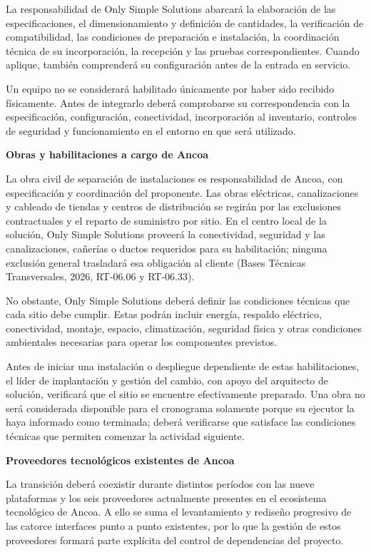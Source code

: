 \documentclass[11pt]{article}
\begin{document}
La responsabilidad de Only Simple Solutions abarcará la elaboración de
las especificaciones, el dimensionamiento y definición de cantidades, la
verificación de compatibilidad, las condiciones de preparación e
instalación, la coordinación técnica de su incorporación, la recepción y
las pruebas correspondientes. Cuando aplique, también comprenderá su
configuración antes de la entrada en servicio.

Un equipo no se considerará habilitado únicamente por haber sido
recibido físicamente. Antes de integrarlo deberá comprobarse su
correspondencia con la especificación, configuración, conectividad,
incorporación al inventario, controles de seguridad y funcionamiento en
el entorno en que será utilizado.

\textbf{Obras y habilitaciones a cargo de Ancoa}

La obra civil de separación de instalaciones es responsabilidad de
Ancoa, con especificación y coordinación del proponente. Las obras
eléctricas, canalizaciones y cableado de tiendas y centros de
distribución se regirán por las exclusiones contractuales y el reparto
de suministro por sitio. En el centro local de la solución, Only Simple
Solutions proveerá la conectividad, seguridad y las canalizaciones,
cañerías o ductos requeridos para su habilitación; ninguna exclusión
  general trasladará esa obligación al cliente (Bases Técnicas
  Transversales, 2026, RT-06.06 y RT-06.33).

No obstante, Only Simple Solutions deberá definir las condiciones
técnicas que cada sitio debe cumplir. Estas podrán incluir energía,
respaldo eléctrico, conectividad, montaje, espacio, climatización,
seguridad física y otras condiciones ambientales necesarias para operar
los componentes previstos.

Antes de iniciar una instalación o despliegue dependiente de estas
habilitaciones, el líder de implantación y gestión del cambio, con apoyo
del arquitecto de solución, verificará que el sitio se encuentre
efectivamente preparado. Una obra no será considerada disponible para el
cronograma solamente porque su ejecutor la haya informado como
terminada; deberá verificarse que satisface las condiciones técnicas que
permiten comenzar la actividad siguiente.

\textbf{Proveedores tecnológicos existentes de Ancoa}

La transición deberá coexistir durante distintos períodos con las nueve
plataformas y los seis proveedores actualmente presentes en el
ecosistema tecnológico de Ancoa. A ello se suma el levantamiento y
rediseño progresivo de las catorce interfaces punto a punto existentes,
por lo que la gestión de estos proveedores formará parte explícita del
control de dependencias del proyecto.
\end{document}

